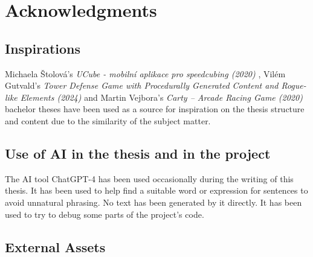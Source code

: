 \chapter{Acknowledgments}

\section{Inspirations}
Michaela Štolová's \textit{UCube - mobilní aplikace pro speedcubing (2020)} \cite{Stolova2020}, Vilém Gutvald's \textit{Tower Defense Game with Procedurally Generated Content and Rogue-like Elements (2024)} \cite{Gutvald2024} and Martin Vejbora's \textit{Carty – Arcade Racing Game (2020)} \cite{Vejbora2020} bachelor theses have been used as a source for inspiration on the thesis structure and content due to the similarity of the subject matter.

\section{Use of AI in the thesis and in the project}
The AI tool ChatGPT-4 has been used occasionally during the writing of this thesis. It has been used to help find a suitable word or expression for sentences to avoid unnatural phrasing. No text has been generated by it directly. It has been used to try to debug some parts of the project's code.

\section{External Assets}